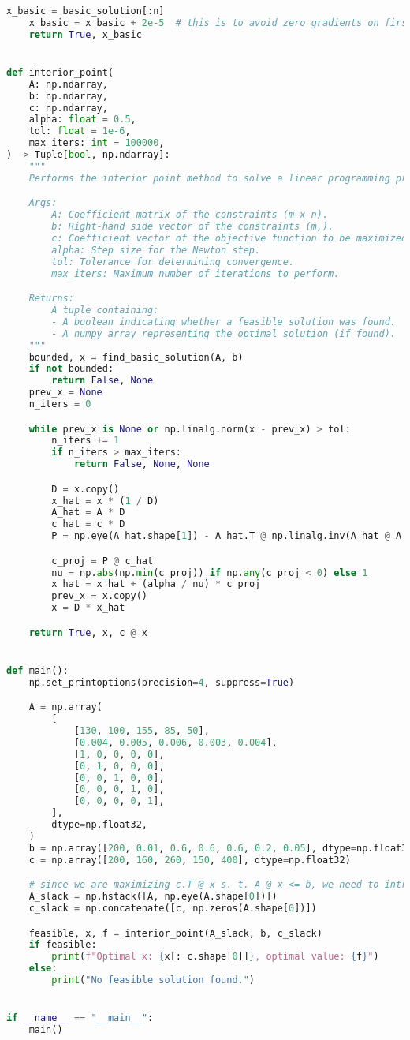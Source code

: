 \documentclass{article}
\begin{document}
\begin{lstlisting}[language=Python]
    x_basic = basic_solution[:n]
    x_basic = x_basic + 2e-5  # this is to avoid zero gradients on first step
    return True, x_basic


def interior_point(
    A: np.ndarray,
    b: np.ndarray,
    c: np.ndarray,
    alpha: float = 0.5,
    tol: float = 1e-6,
    max_iters: int = 100000,
) -> Tuple[bool, np.ndarray]:
    """
    Performs the interior point method to solve a linear programming problem.

    Args:
        A: Coefficient matrix of the constraints (m x n).
        b: Right-hand side vector of the constraints (m,).
        c: Coefficient vector of the objective function to be maximized (n,).
        alpha: Step size for the Newton step.
        tol: Tolerance for determining convergence.
        max_iters: Maximum number of iterations to perform.

    Returns:
        A tuple containing:
        - A boolean indicating whether a feasible solution was found.
        - A numpy array representing the optimal solution (if found).
    """
    bounded, x = find_basic_solution(A, b)
    if not bounded:
        return False, None
    prev_x = None
    n_iters = 0

    while prev_x is None or np.linalg.norm(x - prev_x) > tol:
        n_iters += 1
        if n_iters > max_iters:
            return False, None, None

        D = x.copy()
        x_hat = x * (1 / D)
        A_hat = A * D
        c_hat = c * D
        P = np.eye(A_hat.shape[1]) - A_hat.T @ np.linalg.inv(A_hat @ A_hat.T) @ A_hat

        c_proj = P @ c_hat
        nu = np.abs(np.min(c_proj)) if np.any(c_proj < 0) else 1
        x_hat = x_hat + (alpha / nu) * c_proj
        prev_x = x.copy()
        x = D * x_hat

    return True, x, c @ x


def main():
    np.set_printoptions(precision=4, suppress=True)

    A = np.array(
        [
            [130, 100, 155, 85, 50],
            [0.004, 0.005, 0.006, 0.003, 0.004],
            [1, 0, 0, 0, 0],
            [0, 1, 0, 0, 0],
            [0, 0, 1, 0, 0],
            [0, 0, 0, 1, 0],
            [0, 0, 0, 0, 1],
        ],
        dtype=np.float32,
    )
    b = np.array([200, 0.01, 0.6, 0.6, 0.6, 0.2, 0.05], dtype=np.float32)
    c = np.array([200, 160, 260, 150, 400], dtype=np.float32)

    # since we are maximizing c.T @ x s. t. A @ x <= b, we need to introduce slack variables:
    A_slack = np.hstack([A, np.eye(A.shape[0])])
    c_slack = np.concatenate([c, np.zeros(A.shape[0])])

    feasible, x, f = interior_point(A_slack, b, c_slack)
    if feasible:
        print(f"Optimal x: {x[: c.shape[0]]}, optimal value: {f}")
    else:
        print("No feasible solution found.")


if __name__ == "__main__":
    main()     
\end{lstlisting}
\end{document}
